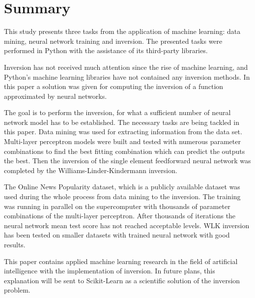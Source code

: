 \chapter{Summary}

This study presents three tasks from the application of machine learning: data mining, neural network training and inversion. The presented tasks were performed in Python with the assistance of its third-party libraries. \medskip

Inversion has not received much attention since the rise of machine learning, and Python's machine learning libraries have not contained any inversion methods. In this paper a solution was given for computing the inversion of a function approximated by neural networks.\medskip

The goal is to perform the inversion, for what a sufficient number of neural network model has to be established. The necessary tasks are being tackled in this paper. Data mining was used for extracting information from the data set. Multi-layer perceptron models were built and tested with numerous parameter combinations to find the best fitting combination which can predict the outputs the best. Then the inversion of the single element feedforward neural network was completed by the Williams-Linder-Kindermann inversion.\medskip

The Online News Popularity dataset, which is a publicly available dataset was used during the whole process from data mining to the inversion. The training was running in parallel on the supercomputer with thousands of parameter combinations of the multi-layer perceptron. After thousands of iterations the neural network mean test score has not reached acceptable levels. WLK inversion has been tested on smaller datasets with trained neural network with good results. \medskip

This paper contains applied machine learning research in the field of artificial intelligence with the implementation of inversion. In future plans, this explanation will be sent to Scikit-Learn as a scientific solution of the inversion problem.